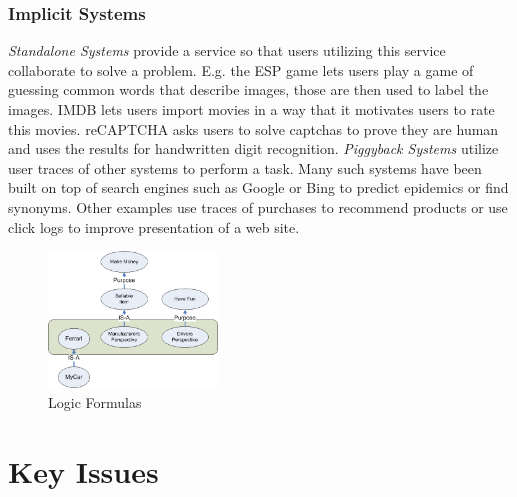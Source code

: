 \documentclass{sig-alternate}
\begin{document}
\subsubsection{Implicit Systems}
\textit{Standalone Systems} provide a service so that users utilizing this service collaborate to solve a problem. E.g. the ESP game lets users play a game of guessing common words that describe images, those are then used to label the images. IMDB lets users import movies in a way that it motivates users to rate this movies. reCAPTCHA asks users to solve captchas to prove they are human and uses the results for handwritten digit recognition.
\newline\newline
\textit{Piggyback Systems} utilize user traces of other systems to perform a task. Many such systems have been built on top of search engines such as Google or Bing to predict epidemics or find synonyms. Other examples use traces of purchases to recommend products or use click logs to improve presentation of a web site.
\begin{figure}[h]
	\centering
	\includegraphics[width=0.4\textwidth]{perspectives}
	\caption{Logic Formulas}
      \label{fig:logic_formulas}
\end{figure}
\section{Key Issues}
\end{document}
